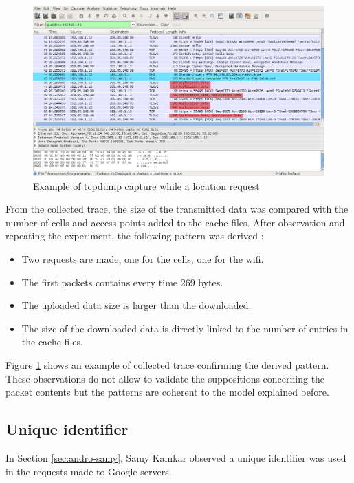 \begin{figure}[h]
  \hspace*{-2cm}
  \centering
  \includegraphics[width=17cm]{images/trace2.png}
  \caption{Example of tcpdump capture while a location request}
  \label{fig:loc-req-tcpdump}
\end{figure}

From the collected trace, the size of the transmitted data was compared with the number of cells and access points added to the cache files.
After observation and repeating the experiment, the following pattern was derived :

\begin{itemize}
\item Two requests are made, one for the cells, one for the wifi.
\item The first packets contains every time 269 bytes.
\item The uploaded data size is larger than the downloaded.
\item The size of the downloaded data is directly linked to the number of entries in the cache files.
\end{itemize}

Figure \ref{fig:loc-req-tcpdump} shows an example of collected trace confirming the derived pattern.
These observations do not allow to validate the suppositions concerning the packet contents but the patterns are coherent to the model explained before.

\subsection{Unique identifier}

In Section \ref{sec:andro-samy}, Samy Kamkar observed a unique identifier was used in the requests made to Google servers.

